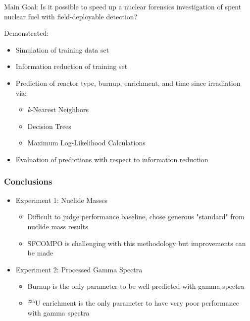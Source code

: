 \begin{frame}
\begin{adjustwidth}{-15pt}{-10pt}
\begin{minipage}{0.65\textwidth}
\begin{block}{Main Goal:}
      \small
      Is it possible to speed up a nuclear forensics investigation of spent
      nuclear fuel with field-deployable detection?
    \end{block}
    \vspace{-8pt}
    \begin{block}{Demonstrated:}
      \small
      \begin{itemize}
        \itemsep 0.1em 
        \item Simulation of training data set
        \item Information reduction of training set
        \item Prediction of reactor type, burnup, enrichment, and time since irradiation via:
          \begin{itemize}
            \item \textit{k}-Nearest Neighbors
            \item Decision Trees
            \item Maximum Log-Likelihood Calculations
          \end{itemize}
        \item Evaluation of predictions with respect to information reduction
      \end{itemize}
    \end{block}
  \end{minipage}
  \end{adjustwidth}
\end{frame}

\begin{frame}
  \frametitle{Conclusions}
  \begin{itemize}
    \item Experiment 1: Nuclide Masses
      \begin{itemize}
        \item Difficult to judge performance baseline, chose generous "standard" from nuclide mass results
        \item SFCOMPO is challenging with this methodology but improvements can be made
      \end{itemize}
    \item Experiment 2: Processed Gamma Spectra
      \begin{itemize}
        \item Burnup is the only parameter to be well-predicted with gamma spectra
        \item ${}^{235}\text{U}$ enrichment is the only parameter to have very poor performance with gamma spectra
      \end{itemize}
    \end{itemize}
\end{frame}


